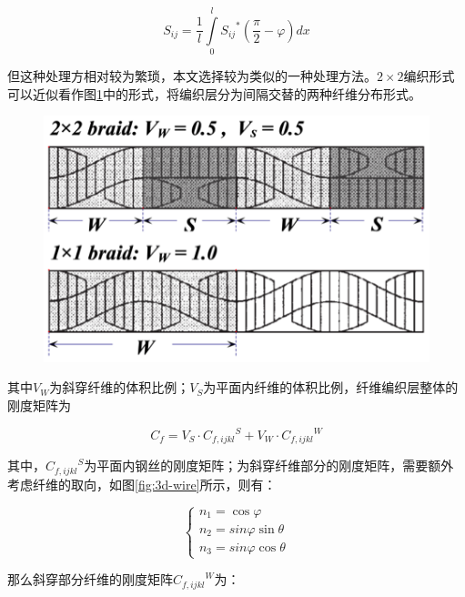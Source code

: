 \begin{equation}
{S_{ij}} = \frac{1}{l}\int\limits_0^l {{S_{ij}}^*\left( \frac{\pi }{2} - \varphi \right)dx} 
\end{equation}

但这种处理方相对较为繁琐，本文选择较为类似的一种处理方法。$ 2\times 2 $编织形式可以近似看作图\ref{fig:3d-wire-3}中的形式，将编织层分为间隔交替的两种纤维分布形式。


\begin{figure}[!htp]
	\centering
	\includegraphics[height=0.2\textheight]{figure/chap5/3d-wire-3}
	\label{fig:3d-wire-3}
\end{figure}

其中$ V_W $为斜穿纤维的体积比例；$ V_S $为平面内纤维的体积比例，纤维编织层整体的刚度矩阵为

\begin{equation}
{C_f} = {V_S} \cdot {C_{f,ijkl}}^S + {V_W} \cdot {C_{f,ijkl}}^W
\end{equation}

其中，$ {C_{f,ijkl}}^S $为平面内钢丝的刚度矩阵；为斜穿纤维部分的刚度矩阵，需要额外考虑纤维的取向，如图\ref{fig:3d-wire}所示，则有：

\begin{equation}
\left\{ \begin{array}{l}
{n_1} = \cos \varphi \\
{n_2} = sin\varphi \sin \theta \\
{n_3} = sin\varphi \cos \theta 
\end{array} \right.
\end{equation}

那么斜穿部分纤维的刚度矩阵$ {C_{f,ijkl}}^W $为：

